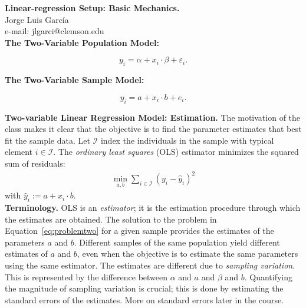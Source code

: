
\let\counterwithout\relax
\let\counterwithin\relax
{}



\noindent \textbf{Linear-regression Setup: Basic Mechanics.}\\
\noindent Jorge Luis García \\
\noindent e-mail: jlgarci@clemson.edu\\

\noindent \textbf{The Two-Variable Population Model:}

\begin{equation}
y_i = \alpha + x_i \cdot \beta + \varepsilon_i.
\end{equation}

\noindent \textbf{The Two-Variable Sample Model:}

\begin{equation}
y_i = a + x_i \cdot b + e_i.
\end{equation}

\noindent \textbf{Two-variable Linear Regression Model: Estimation.} The motivation of the class makes it clear that the objective is to find the parameter estimates that best fit the sample data. Let $\mathcal{I}$ index the individuals in the sample with typical element $i \in \mathcal{I}$. The \textit{ordinary least squares} (OLS) estimator minimizes the squared sum of residuals:
\begin{align}
\min_{a,b} 	\sum \limits _{i \in \mathcal{I}} {\left( y_{i} - \hat{y}_i \right)}^2 \label{eq:problemtwo}
\end{align}
\noindent with $\hat{y}_i:= a + x_{i} \cdot b$.\\

\noindent \textbf{Terminology.} OLS is an \textit{estimator}; it is the estimation procedure through which the estimates are obtained. The solution to the problem in Equation~\eqref{eq:problemtwo} for a given sample provides the estimates of the parameters $a$ and $b$. Different samples of the same population yield different estimates of $a$ and $b$, even when the objective is to estimate the same parameters using the same estimator. The estimates are different due to \textit{sampling variation}. This is represented by the difference between $\alpha$ and $a$ and $\beta$ and $b$. Quantifying the magnitude of sampling variation is crucial; this is done by estimating the standard errors of the estimates. More on standard errors later in the course.\\ 

